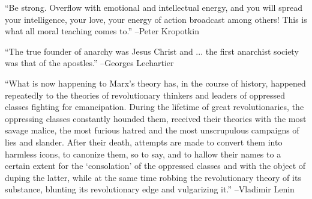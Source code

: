 \documentclass{article}%
\begin{document}
\linebreak%
\vspace{1mm}%
\begin{minipage}{\textwidth}%
\flushleft%
“Be strong. Overflow with emotional and intellectual energy, and you will spread your intelligence, your love, your energy of action broadcast among others! This is what all moral teaching comes to.”%
\linebreak%
\vspace{1mm}%
–Peter Kropotkin%
\linebreak%
\vspace{1mm}%
\end{minipage}%
\linebreak%
\vspace{1mm}%
\begin{minipage}{\textwidth}%
\flushleft%
“The true founder of anarchy was Jesus Christ and ... the first anarchist society was that of the apostles.”%
\linebreak%
\vspace{1mm}%
–Georges Lechartier%
\linebreak%
\vspace{1mm}%
\end{minipage}%
\linebreak%
\vspace{1mm}%
\begin{minipage}{\textwidth}%
\flushleft%
“What is now happening to Marx's theory has, in the course of history, happened repeatedly to the theories of revolutionary thinkers and leaders of oppressed classes fighting for emancipation. During the lifetime of great revolutionaries, the oppressing classes constantly hounded them, received their theories with the most savage malice, the most furious hatred and the most unscrupulous campaigns of lies and slander. After their death, attempts are made to convert them into harmless icons, to canonize them, so to say, and to hallow their names to a certain extent for the ‘consolation’ of the oppressed classes and with the object of duping the latter, while at the same time robbing the revolutionary theory of its substance, blunting its revolutionary edge and vulgarizing it.”%
\linebreak%
\vspace{1mm}%
–Vladimir Lenin%
\linebreak%
\vspace{1mm}%
\end{minipage}%
\linebreak%
\vspace{1mm}%
\end{document}
